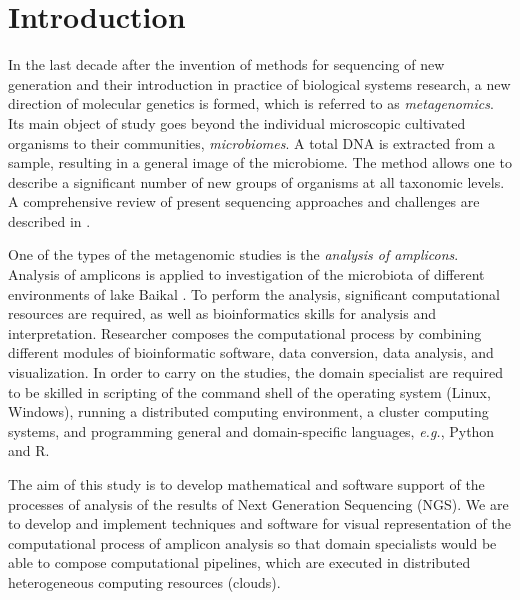 \documentclass[a4paper]{jpconf}
\begin{document}

\section{Introduction}


In the last decade after the invention of methods for sequencing of new generation and their introduction in practice of biological systems research, a new direction of molecular genetics is formed, which is referred to as \emph{metagenomics}. Its main object of study goes beyond the individual microscopic cultivated organisms to their communities, \emph{microbiomes}. A total DNA is extracted from a sample, resulting in a general image of the microbiome. The method allows one to describe a significant number of new groups of organisms at all taxonomic levels. A comprehensive review of present sequencing approaches and challenges are described in \cite{pere20}.

One of the types of the metagenomic studies is the \emph{analysis of amplicons}. Analysis of amplicons is applied to investigation of the microbiota of different environments of lake Baikal \cite{underice}. To perform the analysis, significant computational resources are required, as well as bioinformatics skills for analysis and interpretation. Researcher composes the computational process by combining different modules of bioinformatic software, data conversion, data analysis, and visualization. In order to carry on the studies, the domain specialist are required to be skilled in scripting of the command shell of the operating system (Linux, Windows), running a distributed computing environment, a cluster computing systems, and programming general and domain-specific languages, \emph{e.g.}, Python and R.

The aim of this study is to develop mathematical and software support of the processes of analysis of the results of Next Generation Sequencing (NGS). We are to develop and implement techniques and software for visual representation of the computational process of amplicon analysis so that domain specialists would be able to compose computational pipelines, which are executed in distributed heterogeneous computing resources (clouds). %
\end{document}
